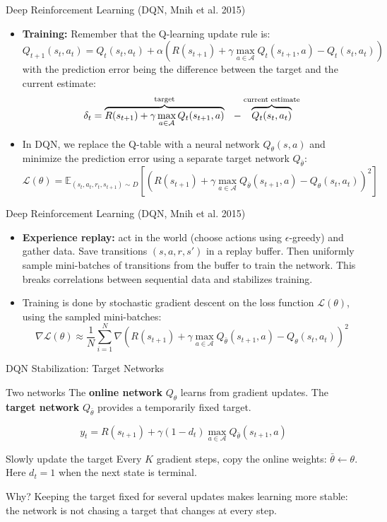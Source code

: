 \documentclass[aspectratio=169]{beamer}%
\begin{document}
\begin{frame}{Deep Reinforcement Learning (DQN, Mnih et al. 2015)}
\begin{itemize}
    \item \textbf{Training:} Remember that the Q-learning update rule is:
    \[
    Q_{t+1}(s_t,a_t) = Q_t(s_t,a_t) + \alpha\left(R(s_{t+1}) + \gamma \max_{a\in\mathcal{A}} Q_t(s_{t+1},a) - Q_t(s_t,a_t)\right)
    \]
    with the prediction error being the difference between the target and the current estimate:
\[
\delta_t = \overbrace{R(s_{t+1}) + \gamma \max_{a\in\mathcal{A}} Q_t(s_{t+1},a)}^{\text{\scriptsize target}}
           \phantom{..} - \overbrace{Q_t(s_t,a_t)}^{\text{\scriptsize current estimate}}
\]
    \item In DQN, we replace the Q-table with a neural network $Q_\theta(s,a)$ and minimize the prediction error using a separate target network $Q_{\bar\theta}$:
    \[
    \mathcal{L}(\theta) = \mathbb{E}_{(s_t,a_t,r_t,s_{t+1})\sim D}\left[\left(R(s_{t+1}) + \gamma \max_{a\in\mathcal{A}} Q_{\bar\theta}(s_{t+1},a) - Q_\theta(s_t,a_t)\right)^2\right]
    \]
\end{itemize}
\end{frame}

\begin{frame}{Deep Reinforcement Learning (DQN, Mnih et al. 2015)}
\begin{itemize}
    \item \textbf{Experience replay:} act in the world (choose actions using $\epsilon$-greedy) and gather data. Save transitions $(s,a,r,s')$ in a replay buffer.
    Then uniformly sample mini-batches of transitions from the buffer to train the network. This breaks correlations between sequential data and stabilizes training.
    \item Training is done by stochastic gradient descent on the loss function $\mathcal{L}(\theta)$, using the sampled mini-batches:
    \[
    \nabla \mathcal{L}(\theta) \approx \frac{1}{N}\sum_{i=1}^{N}\nabla \left(R(s_{t+1}) + \gamma \max_{a\in\mathcal{A}} Q_{\bar\theta}(s_{t+1},a) - Q_\theta(s_t,a_t)\right)^2
    \]
\end{itemize}
\end{frame}

\begin{frame}{DQN Stabilization: Target Networks}
\small
\begin{block}{Two networks}
The \textbf{online network} $Q_\theta$ learns from gradient updates. The \textbf{target network} $Q_{\bar\theta}$ provides a temporarily fixed target.
\end{block}
\[
y_t = R(s_{t+1}) + \gamma(1-d_t)\max_{a\in\mathcal{A}}Q_{\bar\theta}(s_{t+1},a)
\]
\begin{block}{Slowly update the target}
Every $K$ gradient steps, copy the online weights: \(\bar\theta \leftarrow \theta\). Here $d_t=1$ when the next state is terminal.
\end{block}
\begin{alertblock}{Why?}
Keeping the target fixed for several updates makes learning more stable: the network is not chasing a target that changes at every step.
\end{alertblock}
\end{frame}
\end{document}
